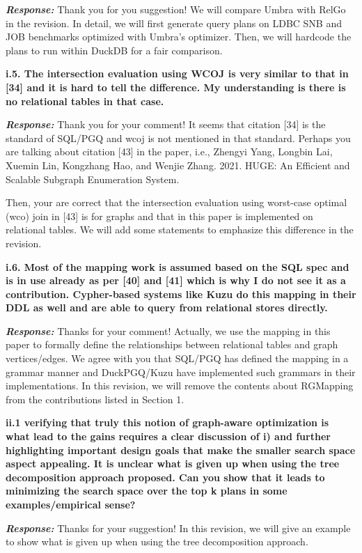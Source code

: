 \textbf{\textit{Response: }}
Thank you for you suggestion! We will compare Umbra with RelGo in the revision. In detail, we will first generate query plans on LDBC SNB and JOB benchmarks optimized with Umbra's optimizer. Then, we will hardcode the plans to run within DuckDB for a fair comparison.


\textbf{
i.5. The intersection evaluation using WCOJ is very similar to that in [34] and it is hard to tell the difference. My understanding is there is no relational tables in that case.}

\textbf{\textit{Response: }}
Thank you for your comment! It seems that citation [34] is the standard of SQL/PGQ and wcoj is not mentioned in that standard.
Perhaps you are talking about citation [43] in the paper, i.e., Zhengyi Yang, Longbin Lai, Xuemin Lin, Kongzhang Hao, and Wenjie Zhang.
2021. HUGE: An Efficient and Scalable Subgraph Enumeration System.

Then, your are correct that the intersection evaluation using worst-case optimal (wco) join in [43] is for graphs and that in this paper is implemented on relational tables.
We will add some statements to emphasize this difference in the revision.


\textbf{
i.6. Most of the mapping work is assumed based on the SQL spec and is in use already as per [40] and [41] which is why I do not see it as a contribution. Cypher-based systems like Kuzu do this mapping in their DDL as well and are able to query from relational stores directly.}

\textbf{\textit{Response: }}
Thanks for your comment! Actually, we use the mapping in this paper to formally define the relationships between relational tables and graph vertices/edges. We agree with you that SQL/PGQ has defined the mapping in a grammar manner and DuckPGQ/Kuzu have implemented such grammars in their implementations. In this revision, we will remove the contents about RGMapping from the contributions listed in Section 1.

\textbf{
ii.1 verifying that truly this notion of graph-aware optimization is what lead to the gains requires a clear discussion of i) and further highlighting important design goals that make the smaller search space aspect appealing.
It is unclear what is given up when using the tree decomposition approach proposed. Can you show that it leads to minimizing the search space over the top k plans in some examples/empirical sense?}

\textbf{\textit{Response: }}
Thanks for your suggestion! In this revision, we will give an example to show what is given up when using the tree decomposition approach. 

